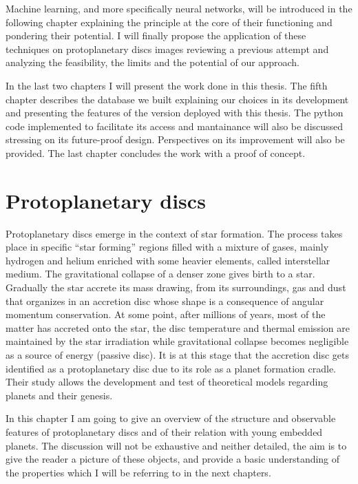 \documentclass[a4paper,10pt]{report}
\begin{document}
Machine learning, and more specifically neural networks, will 
be introduced in the following chapter explaining the principle at the core of their functioning and pondering 
their potential. I will finally propose the application of these techniques on protoplanetary discs images
reviewing a previous attempt \citep{Auddy_2020} and analyzing the feasibility, the limits and the potential of our approach.

In the last two chapters I will present the work done in this thesis. The fifth chapter describes the database we built
explaining our choices in its development and presenting the features of the version deployed with this thesis.
The python code implemented to facilitate its access and mantainance will also be discussed stressing on its future-proof design.
Perspectives on its improvement will also be provided.
The last chapter concludes the work with a proof of concept.

\chapter{Protoplanetary discs}

Protoplanetary discs emerge in the context of star formation. 
The process takes place in specific ``star forming'' regions filled with a mixture of gases, mainly hydrogen and helium enriched with some
heavier elements, called interstellar medium. The gravitational collapse of a denser zone gives birth to a star. Gradually the star
accrete its mass drawing, from its surroundings, gas and dust that organizes in an accretion disc whose shape is a consequence of angular momentum conservation.
At some point, after millions of years, most of the matter has accreted onto the star,
the disc temperature and thermal emission are maintained by the star irradiation while gravitational collapse becomes negligible as a source of energy (passive disc). 
It is at this stage that the accretion disc gets identified
as a protoplanetary disc due to its role as a planet formation cradle.
Their study allows the development and test of theoretical models regarding planets and their genesis.

In this chapter I am going to give an overview of the structure and observable features
of protoplanetary discs and of their relation with young embedded planets. The discussion will not be
exhaustive and neither detailed, the aim is to give
the reader a picture of these objects, and provide a basic understanding of the 
properties which I will be referring to in the next chapters.
\end{document}
